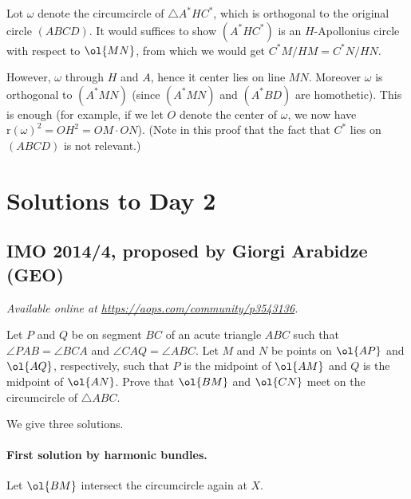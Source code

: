 \documentclass[11pt]{scrartcl}
\begin{document}
Lot $\omega$ denote the circumcircle of $\triangle A^\ast H C^\ast$,
which is orthogonal to the original circle $(ABCD)$.
It would suffices to show $(A^\ast H C^\ast)$
is an $H$-Apollonius circle with respect to $\ol{MN}$,
from which we would get $C^\ast M / H M = C^\ast N / H N$.

However, $\omega$ through $H$ and $A$,
hence it center lies on line $MN$.
Moreover $\omega$ is orthogonal to $(A^\ast MN)$
(since $(A^\ast MN)$ and $(A^\ast BD)$ are homothetic).
This is enough (for example, if we let $O$ denote the center of $\omega$,
we now have $\mathrm{r}(\omega)^2 = OH^2 = OM \cdot ON$).
(Note in this proof that the fact that $C^\ast$ lies on $(ABCD)$
is not relevant.)
\pagebreak

\section{Solutions to Day 2}
\subsection{IMO 2014/4, proposed by Giorgi Arabidze (GEO)}
\textsl{Available online at \url{https://aops.com/community/p3543136}.}
\begin{mdframed}[style=mdpurplebox,frametitle={Problem statement}]
Let $P$ and $Q$ be on segment $BC$ of an acute triangle $ABC$
such that $\angle PAB=\angle BCA$ and $\angle CAQ=\angle ABC$.
Let $M$ and $N$ be points on $\ol{AP}$ and $\ol{AQ}$,
respectively, such that $P$ is the midpoint of $\ol{AM}$
and $Q$ is the midpoint of $\ol{AN}$.
Prove that $\ol{BM}$ and $\ol{CN}$ meet on the
circumcircle of $\triangle ABC$.
\end{mdframed}
We give three solutions.

\paragraph{First solution by harmonic bundles.}
Let $\ol{BM}$ intersect the circumcircle again at $X$.
\end{document}
